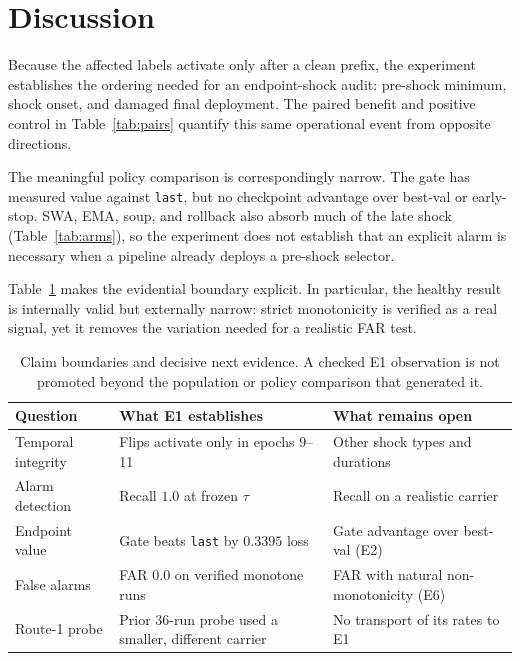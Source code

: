 \documentclass{article} %
\theoremstyle{remark}
\begin{document}
\section{Discussion}
\label{sec:discussion}

Because the affected labels activate only after a clean prefix, the experiment establishes the
ordering needed for an endpoint-shock audit: pre-shock minimum, shock onset, and damaged final
deployment. The paired benefit and positive control in Table~\ref{tab:pairs} quantify this same
operational event from opposite directions.

The meaningful policy comparison is correspondingly narrow. The gate has measured value against
\texttt{last}, but no checkpoint advantage over best-val or early-stop. SWA, EMA, soup, and rollback
also absorb much of the late shock (Table~\ref{tab:arms}), so the experiment does not establish that
an explicit alarm is necessary when a pipeline already deploys a pre-shock selector.

Table~\ref{tab:scope} makes the evidential boundary explicit. In particular, the healthy result is
internally valid but externally narrow: strict monotonicity is verified as a real signal, yet it
removes the variation needed for a realistic FAR test.

\begin{table}[h]
\centering
\caption{Claim boundaries and decisive next evidence. A checked E1 observation is not promoted
beyond the population or policy comparison that generated it.}
\label{tab:scope}
\small
\begin{tabularx}{\linewidth}{@{}lXX@{}}
\toprule
\textbf{Question} & \textbf{What E1 establishes} & \textbf{What remains open} \\
\midrule
Temporal integrity & Flips activate only in epochs 9--11 & Other shock types and durations \\
Alarm detection & Recall $1.0$ at frozen $\tau$ & Recall on a realistic carrier \\
Endpoint value & Gate beats \texttt{last} by $0.3395$ loss & Gate advantage over best-val (E2) \\
False alarms & FAR $0.0$ on verified monotone runs & FAR with natural non-monotonicity (E6) \\
Route-1 probe & Prior 36-run probe used a smaller, different carrier & No transport of its rates to E1 \\
\bottomrule
\end{tabularx}
\end{table}
\end{document}
